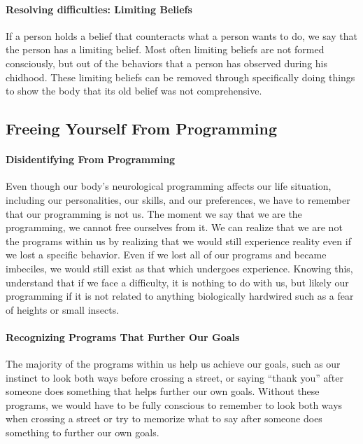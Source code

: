 \documentclass[a4paper, 12pt]{article}
\begin{document}
\paragraph{Resolving difficulties: Limiting Beliefs}
If a person holds a belief that counteracts what a person wants to do, we say that the person has a limiting belief. Most often limiting beliefs are not formed consciously, but out of the behaviors that a person has observed during his chidhood. These limiting beliefs can be removed through specifically doing things to show the body that its old belief was not comprehensive. \\
\subsection{Freeing Yourself From Programming}
\paragraph{Disidentifying From Programming}
Even though our body's neurological programming affects our life situation, including our personalities, our skills, and our preferences, we have to remember that our programming is not us. The moment we say that we are the programming, we cannot free ourselves from it. We can realize that we are not the programs within us by realizing that we would still experience reality even if we lost a specific behavior. Even if we lost all of our programs and became imbeciles, we would still exist as that which undergoes experience. Knowing this, understand that if we face a difficulty, it is nothing to do with us, but likely our programming if it is not related to anything biologically hardwired such as a fear of heights or small insects. \\
\paragraph{Recognizing Programs That Further Our Goals}
The majority of the programs within us help us achieve our goals, such as our instinct to look both ways before crossing a street, or saying ``thank you'' after someone does something that helps further our own goals. Without these programs, we would have to be fully conscious to remember to look both ways when crossing a street or try to memorize what to say after someone does something to further our own goals. \\
\end{document}
